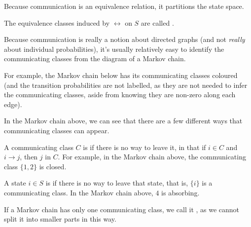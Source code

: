 Because communication is an equivalence relation, it partitions the state space.

\begin{definition}
	The equivalence classes induced by $\longleftrightarrow$ on $S$ are called .
\end{definition}

Because communication is really a notion about directed graphs (and not \emph{really} about individual probabilities), it's usually relatively easy to identify the communicating classes from the diagram of a Markov chain.

For example, the Markov chain below has its communicating classes coloured (and the transition probabilities are not labelled, as they are not needed to infer the communicating classes, aside from knowing they are non-zero along each edge).

\begin{center}
\end{center}

In the Markov chain above, we can see that there are a few different ways that communicating classes can appear.

A communicating class $C$ is  if there is no way to leave it, in that if $i \in C$ and $i \rightarrow j$, then $j$ in $C$. For example, in the Markov chain above, the communicating class $\{1, 2\}$ is closed.

A state $i \in S$ is  if there is no way to leave that state, that is, $\{i\}$ is a communicating class. In the Markov chain above, $4$ is absorbing.

If a Markov chain has only one communicating class, we call it , as we cannot split it into smaller parts in this way.

